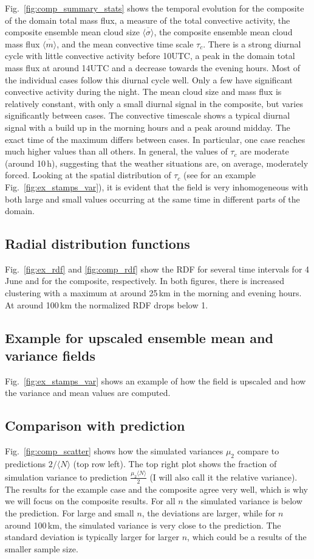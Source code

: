 \documentclass[a4paper, 12pt]{article}
\begin{document}
Fig.~\ref{fig:comp_summary_stats} shows the temporal evolution for the composite of the domain total mass flux, a measure of the total convective activity, the composite ensemble mean cloud size $\overline{\langle \sigma \rangle}$, the composite ensemble mean cloud mass flux $\overline{\langle m \rangle}$, and the mean convective time scale $\tau_c$. There is a strong diurnal cycle with little convective activity before 10UTC, a peak in the domain total mass flux at around 14UTC and a decrease towards the evening hours. Most of the individual cases follow this diurnal cycle well. Only a few have significant convective activity during the night. The mean cloud size and mass flux is relatively constant, with only a small diurnal signal in the composite, but varies significantly between cases. The convective timescale shows a typical diurnal signal with a build up in the morning hours and a peak around midday. The exact time of the maximum differs between cases. In particular, one case reaches much higher values than all others. In general, the values of $\tau_c$ are moderate (around 10\,h), suggesting that the weather situations are, on average, moderately forced. Looking at the spatial distribution of $\tau_c$ (see for an example Fig.~\ref{fig:ex_stamps_var}), it is evident that the field is very inhomogeneous with both large and small values occurring at the same time in different parts of the domain. 

\subsection{Radial distribution functions}
Fig.~\ref{fig:ex_rdf} and \ref{fig:comp_rdf} show the RDF for several time intervals for 4 June and for the composite, respectively. In both figures, there is increased clustering with a maximum at around 25\,km in the morning and evening hours. At around 100\,km the normalized RDF drops below 1. 

\subsection{Example for upscaled ensemble mean and variance fields}
Fig.~\ref{fig:ex_stamps_var} shows an example of how the field is upscaled and how the variance and mean values are computed. 

\subsection{Comparison with prediction}
Fig.~\ref{fig:comp_scatter} shows how the simulated variances $\mu_2$ compare to predictions $2/\langle N \rangle$ (top row left). The top right plot shows the fraction of simulation variance to prediction $\frac{\mu_2 \langle N \rangle}{2}$ (I will also call it the relative variance). The results for the example case and the composite agree very well, which is why we will focus on the composite results. For all $n$ the simulated variance is below the prediction. For large and small $n$, the deviations are larger, while for $n$ around 100\,km, the simulated variance is very close to the prediction. The standard deviation is typically larger for larger $n$, which could be a results of the smaller sample size. 
\end{document}
